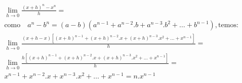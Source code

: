 \begin{ex}
\begin{align}
&\lim_{h\rightarrow 0} \frac{(x+h)^n-x^n}{h}=\nonumber\\
&\text{como}\quad a^n-b^n=(a-b)(a^{n-1}+a^{n-2}.b+a^{n-3}.b^2+\dots+b^{n-1}), \text{temos:}\nonumber\\
&\lim_{h\rightarrow 0} \frac{(x+h-x)[(x+h)^{n-1}+(x+h)^{n-2}.x+(x+h)^{n-3}.x^2+\dots+x^{n-1}]}{h}=\nonumber\\
&\lim_{h\rightarrow 0} \frac{h[(x+h)^{n-1}+(x+h)^{n-2}.x+(x+h)^{n-3}.x^2+\dots+x^{n-1}]}{h}=\nonumber\\
&x^{n-1}+x^{n-2}.x+x^{n-3}.x^2+\dots+x^{n-1}=n.x^{n-1}\nonumber
\end{align}
\end{ex}
